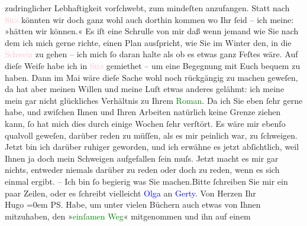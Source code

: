               zudringlicher Lebhaftigkeit vorſchwebt, zum mindeſten anzufangen. \hspace*{1.5em}Statt nach \textcolor{pink}{\textsc{Sils}}{}\ledrightnote{\textcolor{pink}{Sils im Engadin}} könnten wir doch ganz wohl auch dorthin kommen wo {\pb}Ihr ſeid – ich meine: »hätten wir
               können.« Es iſt eine Schrulle von mir daß wenn jemand wie Sie nach dem ich mich gerne
               richte, einen Plan ausſpricht, wie Sie im Winter den, in die \textcolor{pink}{Schweiz}{}\ledrightnote{\textcolor{pink}{Schweiz}} zu gehen – ich mich ſo daran halte als ob es etwas ganz
               Feſtes wäre. Auf dieſe Weiſe habe ich in \textcolor{pink}{\textsc{Sils}}{}\ledrightnote{\textcolor{pink}{Sils im Engadin}} gemiethet – um eine Begegnung mit Euch {\pb}bequem zu haben. Dann im
                  Mai wäre dieſe Sache wohl noch rückgängig zu machen geweſen, da hat
               aber meinen Willen und meine Luſt etwas anderes gelähmt: ich meine mein gar nicht
               glückliches Verhältnis zu Ihrem \textcolor{green}{Roman}{}. Da ich Sie eben ſehr gerne habe, und zwiſchen Ihnen und Ihren
               Arbeiten natürlich keine Grenze ziehen kann, ſo hat mich dies {\pb}durch einige Wochen ſehr verſtört.
               Es wäre mir ebenſo qualvoll geweſen, darüber reden zu müſſen, als es mir peinlich
               war,  zu ſchweigen.\pend
           \pstart
           Jetzt bin ich darüber ruhiger geworden, und ich erwähne es jetzt abſichtlich, weil
               Ihnen ja doch mein Schweigen aufgefallen ſein muſs.\pend
           \pstart
           Jetzt macht es mir gar nichts, {\pb}entweder niemals darüber zu reden oder doch zu reden, wenn es sich einmal
               ergibt.\pend
           \pstart
           \numberlinefalse{}–\numberlinetrue{}\pend
           \pstart
           Ich bin ſo begierig was Sie machen.\hspace*{1.5em}Bitte ſchreiben
               Sie mir ein paar Zeilen, oder es ſchreibt vielleicht \textcolor{blue}{Olga}{}\ledrightnote{\textcolor{blue}{Olga Schnitzler}} an \textcolor{blue}{Gerty}{}\ledrightnote{\textcolor{blue}{Gertrude von Hofmannsthal}}.\pend
           \pstart
           Von Herzen Ihr{\\[\baselineskip]}\spacefill\mbox{Hugo}\pend
           \leftskip=0em{}\pstart
           \noindent{}PS. Habe, um unter vielen Büchern auch etwas von Ihnen mitzuhaben, den »\textcolor{green}{einſamen Weg}{}\ledrightnote{\textcolor{green}{Der einsame Weg. Schauspiel in fünf Akten}}« mitgenommen und ihn auf einem
